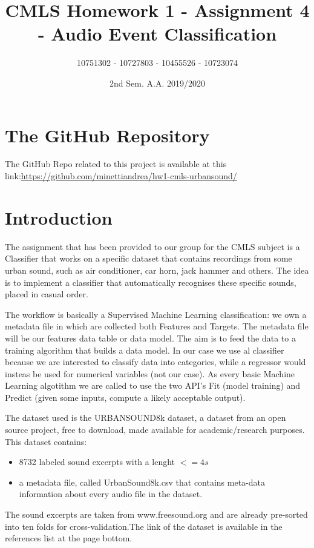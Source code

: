 \documentclass{article}
\title{CMLS Homework 1 - Assignment 4 - Audio Event Classification}
\author{10751302 - 10727803 - 10455526 - 10723074}
\date{2nd Sem. A.A. 2019/2020}
\begin{document}
\maketitle

\section*{The GitHub Repository}
The GitHub Repo related to this project is available at this link:\break \hyperlink{https://github.com/minettiandrea/hw1-cmls-urbansound/}
{https://github.com/minettiandrea/hw1-cmls-urbansound/}

\section*{Introduction}
The assignment that has been provided to our group for the CMLS subject is a Classifier that works on a specific dataset that contains recordings from some urban sound, such as air conditioner, car horn, jack hammer and others. The idea is to implement a classifier that automatically recognises these specific sounds, placed in casual order.

The workflow is basically a Supervised Machine Learning classification: we own a metadata file in which are collected both Features and Targets. The metadata file will be our features data table or data model. The aim is to feed the data to a training algorithm that builds a data model. In our case we use al classifier because we are interested to classify data into categories, while a regressor would insteas be used for numerical variables (not our case).
As every basic Machine Learning algotithm we are called to use the two API's Fit (model training) and Predict (given some inputs, compute a likely acceptable output).

The dataset used is the URBANSOUND8k dataset, a dataset from an open source project, free to download, made available for academic/research purposes. This dataset contains:
\begin{itemize}
  \item 8732 labeled sound excerpts with a lenght $<= 4s$
  \item a metadata file, called UrbanSound8k.csv that contains meta-data information about every audio file in the dataset.
\end{itemize}
The sound excerpts are taken from www.freesound.org and are already pre-sorted into ten folds for cross-validation.The link of the dataset is available in the references list at the page bottom.
\end{document}
